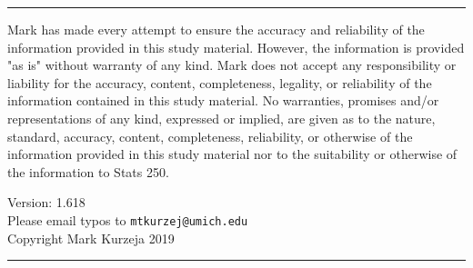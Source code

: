 \documentclass[landscape]{article}
\newcommand{\myline}{\vspace{4pt}\hrule  \vspace{4pt}}
\newenvironment{topic}[1]{
	\noindent \textbf{\textsc{\color{harvardcrimson}{#1}}}
	\noindent \hspace{-3.5pt}
}{
	\myline
}
\begin{document}
\begin{multicols*}{3}
	
	
	\begin{topic}{}
		
	\end{topic}
	
	
	\begin{topic}{Disclaimer} \tiny
		Mark has made every attempt to ensure the accuracy and reliability of the information provided in this study material. However, the information is provided "as is" without warranty of any kind. Mark does not accept any responsibility or liability for the accuracy, content, completeness, legality, or reliability of the information contained in this study material.
		No warranties, promises and/or representations of any kind, expressed or implied, are given as to the nature, standard, accuracy, content, completeness, reliability, or otherwise of the information provided in this study material nor to the suitability or otherwise of the information to Stats 250. 
		\begin{center}
			Version: 1.618\\
			Please email typos to \texttt{mtkurzej@umich.edu}\\
			Copyright Mark Kurzeja 2019				
		\end{center}
	
	
	\end{topic}

		

\end{multicols*}
\end{document}
